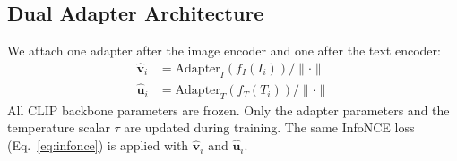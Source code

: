 \documentclass[review,12pt]{elsarticle}
\begin{document}
\subsection{Dual Adapter Architecture}
We attach one adapter after the image encoder and one after the text encoder:
\begin{align}
\hat{\mathbf{v}}_i &= \text{Adapter}_I\!\left(f_I(I_i)\right) / \|\cdot\| \\
\hat{\mathbf{u}}_i &= \text{Adapter}_T\!\left(f_T(T_i)\right) / \|\cdot\|
\end{align}
All CLIP backbone parameters are frozen. Only the adapter parameters and the
temperature scalar $\tau$ are updated during training. The same InfoNCE loss
(Eq.~\ref{eq:infonce}) is applied with $\hat{\mathbf{v}}_i$ and $\hat{\mathbf{u}}_i$.

\end{document}
